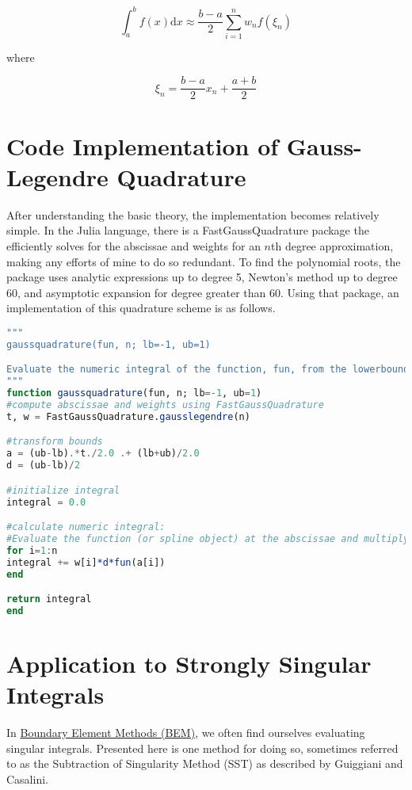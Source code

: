 \[ \int_{a}^{b} f(x) \mathrm{d}x \approx \frac{b-a}{2} \sum_{i=1}^n w_n f(\xi_n) \]

where

\[ \xi_n = \frac{b-a}{2}x_n + \frac{a+b}{2} \]

\section{Code Implementation of Gauss-Legendre Quadrature}
After understanding the basic theory, the implementation becomes relatively simple. In the Julia language, there is a FastGaussQuadrature package the efficiently solves for the abscissae and weights for an $n$th degree approximation, making any efforts of mine to do so redundant. To find the polynomial roots, the package uses analytic expressions up to degree 5, Newton's method up to degree 60, and asymptotic expansion for degree greater than 60. Using that package, an implementation of this quadrature scheme is as follows.

\begin{lstlisting}[language=julia]
"""
gaussquadrature(fun, n; lb=-1, ub=1)

Evaluate the numeric integral of the function, fun, from the lowerbound, lb, to the upper bound, ub, using an n-th degree Gauss-Legendre quadrature rule.
"""
function gaussquadrature(fun, n; lb=-1, ub=1)
#compute abscissae and weights using FastGaussQuadrature
t, w = FastGaussQuadrature.gausslegendre(n)

#transform bounds
a = (ub-lb).*t./2.0 .+ (lb+ub)/2.0
d = (ub-lb)/2

#initialize integral
integral = 0.0

#calculate numeric integral:
#Evaluate the function (or spline object) at the abscissae and multiply by the weights; sum the values together to obtain an estimate of the integral.
for i=1:n
integral += w[i]*d*fun(a[i])
end

return integral
end
\end{lstlisting}

\section{Application to Strongly Singular Integrals}
In \hyperref[ch:boundaryelementmethod]{Boundary Element Methods (BEM)}, we often find ourselves evaluating singular integrals. Presented here is one method for doing so, sometimes referred to as the Subtraction of Singularity Method (SST) \label{vocab:subtractionofsingularity} as described by Guiggiani and Casalini.\cite{Guiggiani1987Direct-computat}

  
 {}

 
